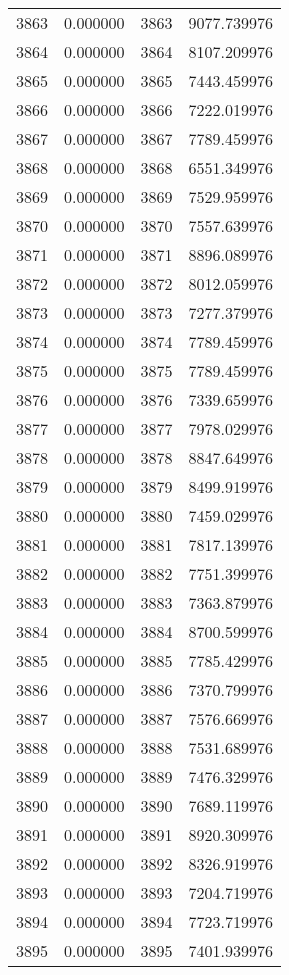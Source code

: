 \documentclass[12pt]{article}
\begin{document}
\begin{longtable}{@{}cccc@{}}
3863 & 0.000000 & 3863 & 9077.739976 \\
3864 & 0.000000 & 3864 & 8107.209976 \\
3865 & 0.000000 & 3865 & 7443.459976 \\
3866 & 0.000000 & 3866 & 7222.019976 \\
3867 & 0.000000 & 3867 & 7789.459976 \\
3868 & 0.000000 & 3868 & 6551.349976 \\
3869 & 0.000000 & 3869 & 7529.959976 \\
3870 & 0.000000 & 3870 & 7557.639976 \\
3871 & 0.000000 & 3871 & 8896.089976 \\
3872 & 0.000000 & 3872 & 8012.059976 \\
3873 & 0.000000 & 3873 & 7277.379976 \\
3874 & 0.000000 & 3874 & 7789.459976 \\
3875 & 0.000000 & 3875 & 7789.459976 \\
3876 & 0.000000 & 3876 & 7339.659976 \\
3877 & 0.000000 & 3877 & 7978.029976 \\
3878 & 0.000000 & 3878 & 8847.649976 \\
3879 & 0.000000 & 3879 & 8499.919976 \\
3880 & 0.000000 & 3880 & 7459.029976 \\
3881 & 0.000000 & 3881 & 7817.139976 \\
3882 & 0.000000 & 3882 & 7751.399976 \\
3883 & 0.000000 & 3883 & 7363.879976 \\
3884 & 0.000000 & 3884 & 8700.599976 \\
3885 & 0.000000 & 3885 & 7785.429976 \\
3886 & 0.000000 & 3886 & 7370.799976 \\
3887 & 0.000000 & 3887 & 7576.669976 \\
3888 & 0.000000 & 3888 & 7531.689976 \\
3889 & 0.000000 & 3889 & 7476.329976 \\
3890 & 0.000000 & 3890 & 7689.119976 \\
3891 & 0.000000 & 3891 & 8920.309976 \\
3892 & 0.000000 & 3892 & 8326.919976 \\
3893 & 0.000000 & 3893 & 7204.719976 \\
3894 & 0.000000 & 3894 & 7723.719976 \\
3895 & 0.000000 & 3895 & 7401.939976 \\

\end{longtable}
\end{document}
